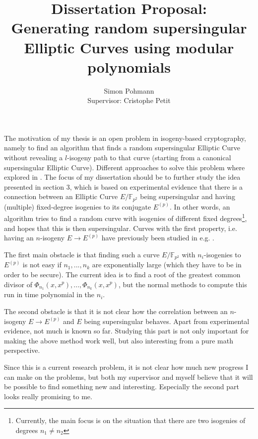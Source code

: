 \documentclass{scrartcl}
\title{Dissertation Proposal:\\Generating random supersingular Elliptic Curves using modular polynomials}
\author{Simon Pohmann\\Supervisor: Cristophe Petit}
\newcommand{\F}{\mathbb{F}}
\theoremstyle{definition}
\begin{document}
\maketitle

The motivation of my thesis is an open problem in isogeny-based cryptography, namely to find an algorithm that finds a random supersingular Elliptic Curve without revealing a $l$-isogeny path to that curve (starting from a canonical supersingular Elliptic Curve).
Different approaches to solve this problem where explored in \cite{base_paper}.
The focus of my dissertation should be to further study the idea presented in section 3, which is based on experimental evidence that there is a connection between an Elliptic Curve $E/\F_{p^2}$ being supersingular and having (multiple) fixed-degree isogenies to its conjugate $E^{(p)}$.
In other words, an algorithm tries to find a random curve with isogenies of different fixed degrees\footnote{Currently, the main focus is on the situation that there are two isogenies of degrees $n_1 \neq n_2$}, and hopes that this is then supersingular.
Curves with the first property, i.e. having an $n$-isogeny $E \to E^{(p)}$ have previously been studied in e.g. \cite{chenu_smith}.

The first main obstacle is that finding such a curve $E/\F_{p^2}$ with $n_i$-isogenies to $E^{(p)}$ is not easy if $n_1, ..., n_k$ are exponentially large (which they have to be in order to be secure).
The current idea is to find a root of the greatest common divisor of $\Phi_{n_1}(x, x^p), ..., \Phi_{n_k}(x, x^p)$, but the normal methods to compute this run in time polynomial in the $n_i$.

The second obstacle is that it is not clear how the correlation between an $n$-isogeny $E \to E^{(p)}$ and $E$ being supersingular behaves.
Apart from experimental evidence, not much is known so far.
Studying this part is not only important for making the above method work well, but also interesting from a pure math perspective.

Since this is a current research problem, it is not clear how much new progress I can make on the problems, but both my supervisor and myself believe that it will be possible to find something new and interesting.
Especially the second part looks really promising to me.

\printbibliography
\end{document}
